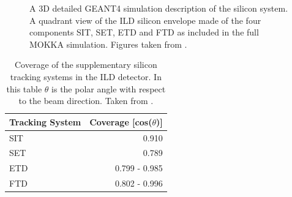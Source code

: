 \begin{figure}[h!]
\centering
{}
\caption[\protect{} A 3D detailed GEANT4 simulation description of the silicon system.  \protect{} A quadrant view of the ILD silicon envelope made of the four components SIT, SET, ETD and FTD as included in the full MOKKA simulation.  Figures taken from  \cite{Behnke:2013lya}.]{\protect{} A 3D detailed GEANT4 simulation description of the silicon system.  \protect{} A quadrant view of the ILD silicon envelope made of the four components SIT, SET, ETD and FTD as included in the full MOKKA simulation.  Figures taken from  \cite{Behnke:2013lya}.}
\label{fig:vertex}
\end{figure} 

\begin{table}[h!]
\centering
\begin{tabular}{ l r}
\hline
Tracking System & Coverage [cos($\theta$)] \\
\hline
SIT & 0.910 \\
SET & 0.789 \\
ETD & 0.799 - 0.985 \\
FTD & 0.802 - 0.996\\
\hline
\end{tabular}
\caption[Coverage of the supplementary silicon tracking systems in the ILD detector.  In this table $\theta$ is the polar angle with respect to the beam direction.  Taken from \cite{Behnke:2013lya}.]{Coverage of the supplementary silicon tracking systems in the ILD detector.  In this table $\theta$ is the polar angle with respect to the beam direction.  Taken from \cite{Behnke:2013lya}.}
 \label{table:supptrackingcoverage}
\end{table}

